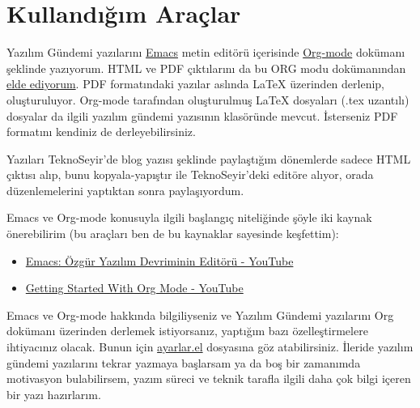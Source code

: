 \documentclass[11pt]{article}
\begin{document}
\section*{Kullandığım Araçlar}
\label{sec:orgcc798e1}
Yazılım Gündemi yazılarını \href{https://www.gnu.org/software/emacs/}{Emacs} metin editörü içerisinde \href{https://orgmode.org}{Org-mode} dokümanı
şeklinde yazıyorum. HTML ve PDF çıktılarını da bu ORG modu dokümanından \href{https://orgmode.org/manual/Exporting.html\#Exporting}{elde
ediyorum}. PDF formatındaki yazılar aslında \LaTeX{} üzerinden derlenip,
oluşturuluyor. Org-mode tarafından oluşturulmuş \LaTeX{} dosyaları (.tex
uzantılı) dosyalar da ilgili yazılım gündemi yazısının klasöründe mevcut.
İsterseniz PDF formatını kendiniz de derleyebilirsiniz.

Yazıları TeknoSeyir'de blog yazısı şeklinde paylaştığım dönemlerde sadece HTML
çıktısı alıp, bunu kopyala-yapıştır ile TeknoSeyir'deki editöre alıyor, orada
düzenlemelerini yaptıktan sonra paylaşıyordum.

Emacs ve Org-mode konusuyla ilgili başlangıç niteliğinde şöyle iki kaynak
önerebilirim (bu araçları ben de bu kaynaklar sayesinde keşfettim):
\begin{itemize}
\item \href{https://www.youtube.com/watch?v=FsN3Yp05\_aQ}{Emacs: Özgür Yazılım Devriminin Editörü - YouTube}
\item \href{https://www.youtube.com/watch?v=SzA2YODtgK4}{Getting Started With Org Mode - YouTube}
\end{itemize}

Emacs ve Org-mode hakkında bilgiliyseniz ve Yazılım Gündemi yazılarını Org
dokümanı üzerinden derlemek istiyorsanız, yaptığım bazı özelleştirmelere
ihtiyacınız olacak. Bunun için \href{ayarlar.el}{ayarlar.el} dosyasına göz atabilirsiniz.
İleride yazılım gündemi yazılarını tekrar yazmaya başlarsam ya da boş bir
zamanımda motivasyon bulabilirsem, yazım süreci ve teknik tarafla ilgili daha
çok bilgi içeren bir yazı hazırlarım.
\end{document}
